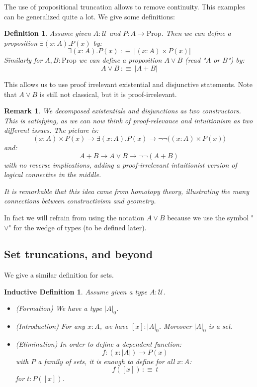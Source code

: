 \documentclass{article}
\newcommand{\sse}[1]{\medbreak \subsection{#1}}
\newcommand{\U}{{\mathcal U}}
\renewcommand{\r}{\rightarrow}
\newcommand{\Prop}{\mathrm{Prop}}
\newtheorem{definition}{Definition}
\newtheorem{remark}{Remark}
\newtheorem{ind_def}{Inductive Definition}
\begin{document}
The use of propositional truncation allows to remove continuity. This examples can be generalized quite a lot. We give some definitions:

\begin{definition}
Assume given $A:\U$ and $P:A\r \Prop$. Then we can define a proposition $\exists (x:A).P(x)$ by:
\[\exists (x:A). P(x) \ :\equiv\ |(x:A)\times P(x)|\]
Similarly for $A,B:\Prop$ we can define a proposition $A\lor B$ (read "$A$ or $B$") by:
\[A\lor B \ :\equiv\ |A+B|\]
\end{definition}

This allows us to use proof irrelevant existential and disjunctive statements. Note that $A\lor B$ is still not classical, but it is proof-irrelevant. 

\begin{remark}
We decomposed existentials and disjunctions as two constructors. This is satisfying, as we can now think of proof-relevance and intuitionism as two different issues. The picture is:
\[(x:A)\times P(x) \r \exists(x:A).P(x)\r \lnot\lnot\big((x:A)\times P(x)\big)\]
and: 
\[A+B \r A\lor B \r \lnot\lnot(A+B)\]
with no reverse implications, adding a \emph{proof-irrelevant intuitionist} version of logical connective in the middle. 

It is remarkable that this idea came from homotopy theory, illustrating the many connections between constructivism and geometry.
\end{remark}

In fact we will refrain from using the notation $A\lor B$ because we use the symbol "$\lor$" for the wedge of types (to be defined later).

\sse{Set truncations, and beyond}

We give a similar definition for sets.

\begin{ind_def}
Assume given a type $A:\U$.
\begin{itemize}
\item (Formation) We have a type $|A|_0$.
\item (Introduction) For any $x:A$, we have $[x]:|A|_0$. Moreover $|A|_0$ is a set.
\item (Elimination) In order to define a dependent function: 
\[f:(x:|A|) \r P(x)\]
with $P$ a family of sets, it is enough to define for all $x:A$:
\[f([x])\, :\equiv \, t\]
for $t:P([x])$.
\end{itemize}
\end{ind_def}
\end{document}
